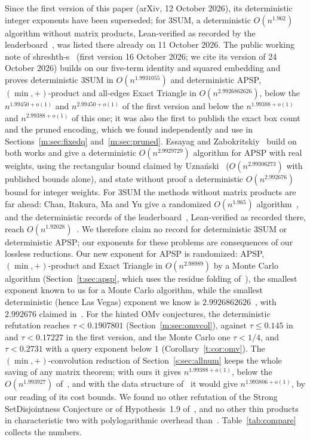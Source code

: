 \documentclass[11pt]{article}
\theoremstyle{definition}
\theoremstyle{remark}
\newcommand{\ExpThreeSumVone}{1.99450}%
\newcommand{\ExpThreeSumBest}{1.99388}%
\newcommand{\ExpThreeSumShrTwentySix}{1.9931055}%
\newcommand{\MinConvShrTwentySix}{1.993927}%
\newcommand{\MinConvRBest}{1.99388}%
\newcommand{\HintedOMvRtwenty}{0.1907801}%
\newcommand{\APSPdetNow}{2.9926862626}%
\newcommand{\APSPrealDetNow}{2.9929729}%
\newcommand{\APSPmcOurs}{2.98989}%
\newcommand{\HintedOMvLitDet}{0.17227}%
\newcommand{\HintedOMvMcOurs}{0.2731}%
\newcommand{\ExpAPSPBest}{2.99388}%
\newcommand{\MinConvShrLemmaThirtyOne}{1.993806}%
\newcommand{\APSPdetShrTwentySix}{2.9926862626}%
\newcommand{\APSPdetEZClaim}{2.992676}%
\newcommand{\ExpAPSPVone}{2.99450}%
\newcommand{\ThreeSumRandCIMY}{1.965}%
\newcommand{\ThreeSumDetLean}{1.92028}%
\newcommand{\APSPrealDetPublished}{2.99306273}%
\newcommand{\ThreeSumDetLeanOct}{1.962}%
\begin{document}
Since the first version of this paper (arXiv, 12 October 2026), its deterministic integer exponents have been superseded; for 3SUM, a deterministic $O(n^{\ThreeSumDetLeanOct})$ algorithm without matrix products, Lean-verified as recorded by the leaderboard~\cite{BOS26}, was listed there already on 11 October 2026. The public working note of shreshth-s~\cite{Shr26} (first version 16 October 2026; we cite its version of 24 October 2026) builds on our five-term identity and squared embedding and proves deterministic 3SUM in $O(n^{\ExpThreeSumShrTwentySix})$ and deterministic APSP, $(\min,+)$-product and all-edges Exact Triangle in $O(n^{\APSPdetShrTwentySix})$, below the $n^{\ExpThreeSumVone+o(1)}$ and $n^{\ExpAPSPVone+o(1)}$ of the first version and below the $n^{\ExpThreeSumBest+o(1)}$ and $n^{\ExpAPSPBest+o(1)}$ of this one; it was also the first to publish the exact box count and the pruned encoding, which we found independently and use in Sections~\ref{m:sec:fixedq} and~\ref{m:sec:pruned}. Essayag and Zabokritskiy~\cite{EZ26} build on both works and give a deterministic $O(n^{\APSPrealDetNow})$ algorithm for APSP with real weights, using the rectangular bound claimed by Uzna\'nski~\cite{Uzn26} ($O(n^{\APSPrealDetPublished})$ with published bounds alone), and state without proof a deterministic $O(n^{\APSPdetEZClaim})$ bound for integer weights. For 3SUM the methods without matrix products are far ahead: Chan, Itakura, Ma and Yu give a randomized $O(n^{\ThreeSumRandCIMY})$ algorithm~\cite{CIMY26}, and the deterministic records of the leaderboard~\cite{BOS26}, Lean-verified as recorded there, reach $O(n^{\ThreeSumDetLean})$~\cite{Wang26}. We therefore claim no record for deterministic 3SUM or deterministic APSP; our exponents for these problems are consequences of our lossless reductions. Our new exponent for APSP is randomized: APSP, $(\min,+)$-product and Exact Triangle in $O(n^{\APSPmcOurs})$ by a Monte Carlo algorithm (Section~\ref{t:sec:apsp}, which uses the residue folding of~\cite[Lemma~8]{Shr26}), the smallest exponent known to us for a Monte Carlo algorithm, while the smallest deterministic (hence Las Vegas) exponent we know is $\APSPdetNow$~\cite{Shr26}, with $\APSPdetEZClaim$ claimed in~\cite[v2, footnote~1]{EZ26}. For the hinted OMv conjectures, the deterministic refutation reaches $\tau<\HintedOMvRtwenty$ (Section~\ref{m:sec:omvcol}), against $\tau\le0.145$ in~\cite{Shr26} and $\tau<\HintedOMvLitDet$ in the first version, and the Monte Carlo one $\tau<1/4$, and $\tau<\HintedOMvMcOurs$ with a query exponent below $1$ (Corollary~\ref{t:cor:omv}). The $(\min,+)$-convolution reduction of Section~\ref{s:sec:allnum} keeps the whole saving of any matrix theorem; with ours it gives $n^{\MinConvRBest+o(1)}$, below the $O(n^{\MinConvShrTwentySix})$ of~\cite[Corollary~59]{Shr26}, and with the data structure of~\cite[Lemma~31]{Shr26} it would give $n^{\MinConvShrLemmaThirtyOne+o(1)}$, by our reading of its cost bounds. We found no other refutation of the Strong SetDisjointness Conjecture or of Hypothesis~1.9 of~\cite{ABFK24}, and no other thin products in characteristic two with polylogarithmic overhead than~\cite{Maj26b}. Table~\ref{tab:compare} collects the numbers.
\end{document}
